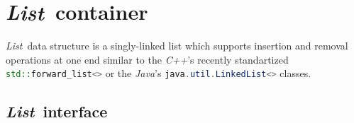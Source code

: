 \documentclass[a4paper]{article}
\newcommand{\Cpp}{\emph{C++}}
\newcommand{\Java}{\emph{Java}}
\begin{document}


\newcommand{\List}{\emph{List}}
\section{\List\ container}


\List\ data structure is a singly-linked list which supports insertion and removal operations at one end similar to the \Cpp's recently standartized \lstinline[language=C++]{std::forward_list<>} or the \Java's \lstinline[language=Java]{java.util.LinkedList<>} classes.


\subsection{\List\ interface}
\end{document}
